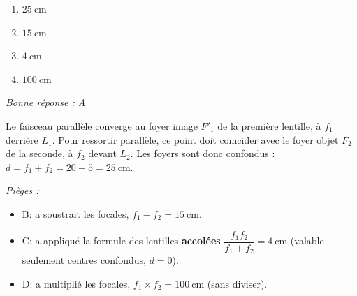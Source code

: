 \documentclass[11pt,a4paper]{article}
\begin{document}
\begin{enumerate}[label=\Alph*)]
\item $\qty{25}{\centi\metre}$
\item $\qty{15}{\centi\metre}$
\item $\qty{4}{\centi\metre}$
\item $\qty{100}{\centi\metre}$
\end{enumerate}
\textit{Bonne réponse : A}\par
Le faisceau parallèle converge au foyer image $F'_1$ de la première lentille, à $f_1$ derrière $L_1$. Pour
ressortir parallèle, ce point doit coïncider avec le foyer objet $F_2$ de la seconde, à $f_2$ devant $L_2$.
Les foyers sont donc confondus : $d=f_1+f_2=20+5=\qty{25}{\centi\metre}$.\par
\textit{Pièges :}
\begin{itemize}
\item B: a soustrait les focales, $f_1-f_2=\qty{15}{\centi\metre}$.
\item C: a appliqué la formule des lentilles \textbf{accolées} $\dfrac{f_1 f_2}{f_1+f_2}=\qty{4}{\centi\metre}$ (valable seulement centres confondus, $d=0$).
\item D: a multiplié les focales, $f_1\times f_2=\qty{100}{\centi\metre}$ (sans diviser).
\end{itemize}
\end{document}
